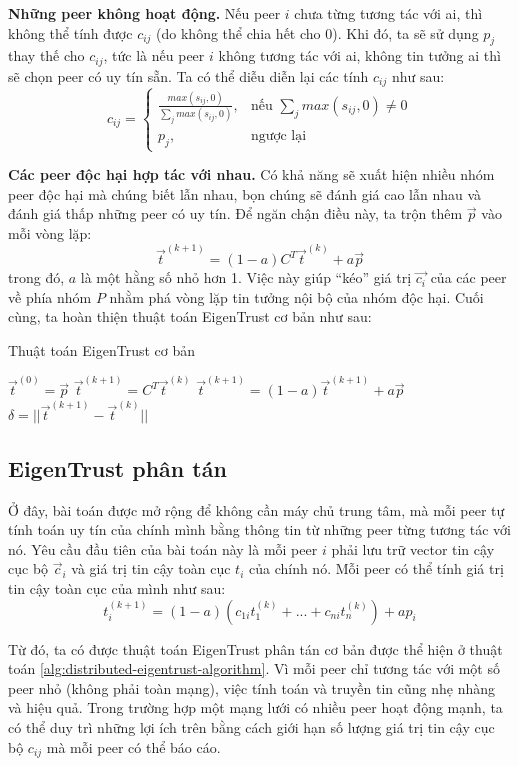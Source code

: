 \textbf{Những peer không hoạt động.} Nếu peer $i$ chưa từng tương tác với ai, thì không thể tính được $c_{ij}$ (do không thể chia hết cho 0).
Khi đó, ta sẽ sử dụng $p_j$ thay thế cho $c_{ij}$, tức là nếu peer $i$ không tương tác với ai, không tin tưởng ai thì sẽ chọn peer có uy tín sẵn.
Ta có thể diễu diễn lại các tính $c_{ij}$ như sau:
\[
  c_{ij} =
  \begin{cases}
    \frac{max(s_{ij}, 0)}{\sum_{j} max(s_{ij}, 0)}, & \text{nếu } \sum_{j} max(s_{ij}, 0) \neq 0 \\
    p_j,     & \text{ngược lại}
  \end{cases}
\]

\textbf{Các peer độc hại hợp tác với nhau.} Có khả năng sẽ xuất hiện nhiều nhóm peer độc hại mà chúng biết lẫn nhau, bọn chúng sẽ đánh giá cao lẫn nhau và đánh giá thấp những peer có uy tín.
Để ngăn chận điều này, ta trộn thêm $\vec{p}$ vào mỗi vòng lặp:
\[\vec{t}^{(k+1)} = (1 - a)C^{T}\vec{t}^{(k)} + a\vec{p}\]
trong đó, $a$ là một hằng số nhỏ hơn 1. Việc này giúp ``kéo'' giá trị $\vec{c_i}$ của các peer về phía nhóm $P$ nhằm phá vòng lặp tin tưởng nội bộ của nhóm độc hại. Cuối cùng, ta hoàn thiện thuật toán EigenTrust cơ bản như sau:

\begin{algorithm}
  \caption{Thuật toán EigenTrust cơ bản}
  \label{alg:basic-eigentrust-algorithm}
  \begin{algorithmic}
    \State $\vec{t}^{(0)} = \vec{p}$
    \Repeat
    \State $\vec{t}^{(k+1)} = C^{T}\vec{t}^{(k)}$
    \State $\vec{t}^{(k+1)} = (1 - a)\vec{t}^{(k+1)} + a\vec{p}$
    \State $\delta = || \vec{t}^{(k+1)} - \vec{t}^{(k)} ||$
    \Until{$\delta < \epsilon$}
  \end{algorithmic}
\end{algorithm}

\subsection{EigenTrust phân tán}

Ở đây, bài toán được mở rộng để không cần máy chủ trung tâm, mà mỗi peer tự tính toán uy tín của chính mình bằng thông tin từ những peer từng tương tác với nó.
Yêu cầu đầu tiên của bài toán này là mỗi peer $i$ phải lưu trữ vector tin cậy cục bộ $\vec{c}_i$ và giá trị tin cậy toàn cục $t_i$ của chính nó.
Mỗi peer có thể tính giá trị tin cậy toàn cục của mình như sau:
\[t_i^{(k+1)} = (1 - a)(c_{1i}t_1^{(k)} + ... + c_{ni}t_n^{(k)}) + ap_i\]

Từ đó, ta có được thuật toán EigenTrust phân tán cơ bản được thể hiện ở thuật toán \ref{alg:distributed-eigentrust-algorithm}. 
Vì mỗi peer chỉ tương tác với một số peer nhỏ (không phải toàn mạng), việc tính toán và truyền tin cũng nhẹ nhàng và hiệu quả.
Trong trường hợp một mạng lưới có nhiều peer hoạt động mạnh, ta có thể duy trì những lợi ích trên bằng cách giới hạn số lượng giá trị tin cậy cục bộ $c_{ij}$ mà mỗi peer
có thể báo cáo.

